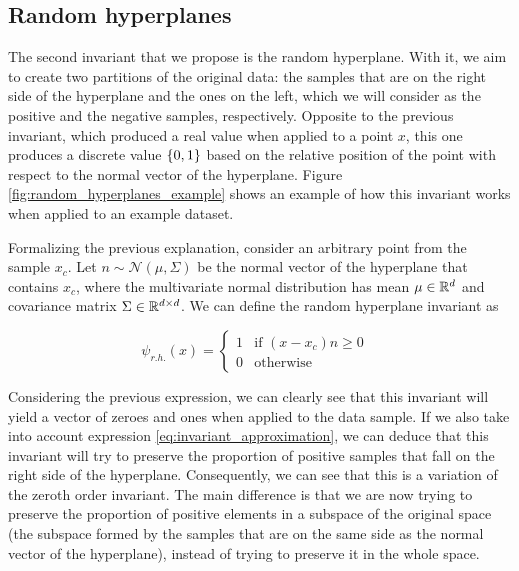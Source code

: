 \subsection{Random hyperplanes}

The second invariant that we propose is the random hyperplane. With it, we aim to create two partitions of
the original data: the samples that are on the right side of the hyperplane and the ones on the left, which
we will consider as the positive and the negative samples, respectively. Opposite to the previous invariant, which
produced a real value when applied to a point $x$, this one produces a discrete value $\lbrace 0, 1 \rbrace$ based on the
relative position of the point with respect to the normal vector of the hyperplane.
Figure \ref{fig:random_hyperplanes_example} shows an example of how this invariant works when applied to
an example dataset.

Formalizing the previous explanation, consider an arbitrary point from the sample $x_c$. Let
$n \sim \mathcal{N}(\mu, \Sigma)$ be the normal vector of the hyperplane that contains $x_c$, where the
multivariate normal distribution has mean $\mu \in \mathbb{R}^{d}$ and covariance matrix $\Sigma \in \mathbb{R}^{d \times d}$.
We can define the random hyperplane invariant as

\begin{equation}
    \label{eq:random_hyperplane_invariant}
    \psi_{r.h.}(x) =
    \begin{cases}
        1 & \text{if $(x - x_c)n \geq 0$ }\\
        0 & \text{otherwise}
    \end{cases}
\end{equation}

Considering the previous expression, we can clearly see that this invariant will yield a vector of zeroes
and ones when applied to the data sample. If we also take into account expression \eqref{eq:invariant_approximation},
we can deduce that this invariant will try to preserve the proportion of positive samples that fall on the right
side of the hyperplane. Consequently, we can see that this is a variation of the zeroth order invariant.
The main difference is that we are now trying to preserve the proportion of positive elements in a subspace
of the original space (the subspace formed by the samples that are on the same side as the normal vector of the
hyperplane), instead of trying to preserve it in the whole space.

